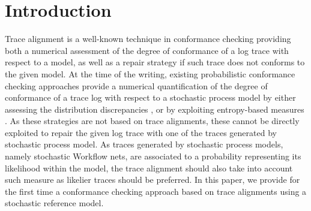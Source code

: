 
\section{Introduction}
\label{introduction}
Trace alignment is a well-known technique in conformance checking \cite{DBLP:conf/edoc/AdriansyahDA11} providing both a numerical assessment of the degree of conformance of a log trace with respect to a model, as well as a repair strategy if such trace does not conforms to the given model. At the time of the writing, 
%
existing probabilistic conformance checking approaches %
provide a numerical quantification of the degree of conformance
of a trace log with respect to a stochastic process model \cite{DBLP:journals/tosem/PolyvyanyySWCM20}
by either assessing the distribution discrepancies \cite{DBLP:conf/bpm/LeemansSA19}, or by exploiting entropy-based measures \cite{DBLP:conf/icpm/PolyvyanyyK19}. As these strategies are not based on trace alignments, these cannot be directly exploited to repair the given log trace with one of the traces generated by stochastic process model. As traces generated by stochastic process models, namely  stochastic Workflow nets, are associated to a probability representing its likelihood within the model, the trace alignment should also take into account such measure as likelier traces should be preferred.
In this paper, we provide for the first time a conformance checking approach based on trace alignments using a stochastic reference
model.


